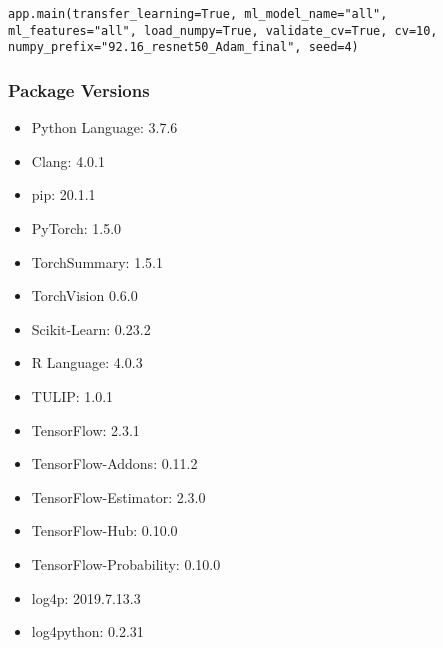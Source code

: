 \begin{enumerate}
\texttt{app.main(transfer\_learning=True, ml\_model\_name="all", ml\_features="all", load\_numpy=True, validate\_cv=True, cv=10,          numpy\_prefix="92.16\_resnet50\_Adam\_final", seed=4)}

\end{enumerate}



\subsubsection*{Package Versions}\label{package-versions}

\begin{itemize}
\item
  Python Language: 3.7.6
\item
  Clang: 4.0.1
\item
  pip: 20.1.1\\
\item
  PyTorch: 1.5.0
\item
  TorchSummary: 1.5.1
\item
  TorchVision 0.6.0
\item
  Scikit-Learn: 0.23.2\\
\item
  R Language: 4.0.3
\item
  TULIP: 1.0.1
\item
  TensorFlow: 2.3.1\\
\item
  TensorFlow-Addons: 0.11.2
\item
  TensorFlow-Estimator: 2.3.0
\item
  TensorFlow-Hub: 0.10.0
\item
  TensorFlow-Probability: 0.10.0\\
\item
  log4p: 2019.7.13.3
\item
  log4python: 0.2.31
\end{itemize}
